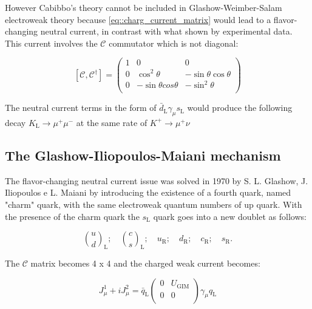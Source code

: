 However Cabibbo's theory cannot be included in Glashow-Weimber-Salam electroweak theory because \autoref{eq::charg_current_matrix} would lead to a flavor-changing neutral current, in contrast with what shown by experimental data. This current involves the $\mathcal{C}$ commutator which is not diagonal:

\begin{equation}
\left[\mathcal{C}, \mathcal{C}^{\dagger} \right]
=
\begin{pmatrix}
1 &0 &0 \\
0 &\cos^{2}\theta &-\sin\theta \cos\theta \\
0 &-\sin\theta cos\theta &-\sin^{2}\theta\\
\end{pmatrix}
\end{equation}

The neutral current terms in the form of $\bar{d}_{\text{L}}\gamma_{\mu}s_{\text{L}}$ would produce the following decay $K_{\text{L}} \longrightarrow \mu^{+}\mu^{-}$ at the same rate of $K^{+} \longrightarrow \mu^{+}\nu$

\subsection{The Glashow-Iliopoulos-Maiani mechanism}

The flavor-changing neutral current issue was solved in 1970 by S. L. Glashow, J. Iliopoulos e L. Maiani \cite{Glashow:1970gm} by introducing the existence of a fourth quark, named "charm" quark, with the same electroweak quantum numbers of up quark. With the presence of the charm quark the $s_{\text{L}}$ quark goes into a new doublet as follows: 

\begin{equation}
\binom{u}{d}_{\text{L}}; \quad \binom{c}{s}_{\text{L}}; \quad u_{\text{R}}; \quad d_{\text{R}}; \quad c_{\text{R}}; \quad s_{\text{R}}.
\end{equation}

The $\mathcal{C}$ matrix becomes 4 x 4 and the charged weak current becomes:

\begin{equation}
J^{1}_{\mu} + i J^{2}_{\mu} = \bar{q}_{\text{L}} 
\begin{pmatrix}
0 &U_{\text{GIM}} \\
0 &0 \\
\end{pmatrix}
\gamma_{\mu}q_{\text{L}}
\label{eq::cab_current_gim}
\end{equation}

